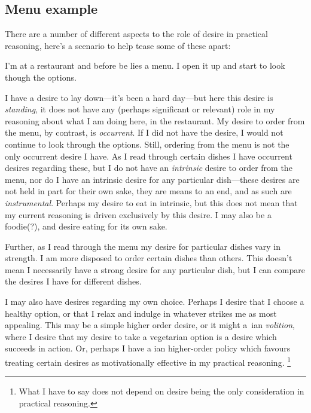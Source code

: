\documentclass[10pt]{article}
\begin{document}


\subsection{Menu example}
\label{sec:menu-example}

There are a number of different aspects to the role of desire in practical reasoning, here's a scenario to help tease some of these apart:

\begin{scenario}
  I'm at a restaurant and before be lies a menu. I open it up and start to look though the options.

  I have a desire to lay down---it's been a hard day---but here this desire is \emph{standing}, it does not have any (perhaps significant or relevant) role in my reasoning about what I am doing here, in the restaurant. My desire to order from the menu, by contrast, is \emph{occurrent}. If I did not have the desire, I would not continue to look through the options. Still, ordering from the menu is not the only occurrent desire I have. As I read through certain dishes I have occurrent desires regarding these, but I do not have an \emph{intrinsic} desire to order from the menu, nor do I have an intrinsic desire for any particular dish---these desires are not held in part for their own sake, they are means to an end, and as such are \emph{instrumental}. Perhaps my desire to eat in intrinsic, but this does not mean that my current reasoning is driven exclusively by this desire. I may also be a foodie(?), and desire eating for its own sake.

  Further, as I read through the menu my desire for particular dishes vary in strength. I am more disposed to order certain dishes than others. This doesn't mean I necessarily have a strong desire for any particular dish, but I can compare the desires I have for different dishes.

  I may also have desires regarding my own choice. Perhaps I desire that I choose a healthy option, or that I relax and indulge in whatever strikes me as most appealing. This may be a simple higher order desire, or it might a~\citeauthor{Frankfurt:1971aa}ian \emph{volition}, where I desire that my desire to take a vegetarian option is a desire which succeeds in action. Or, perhaps I have a \citeauthor{Bratman:2003aa}ian higher-order policy which favours treating certain desires as motivationally effective in my practical reasoning.\nolinebreak
  \footnote{What I have to say does not depend on desire being the only consideration in practical reasoning.}


\end{scenario}
\end{document}
